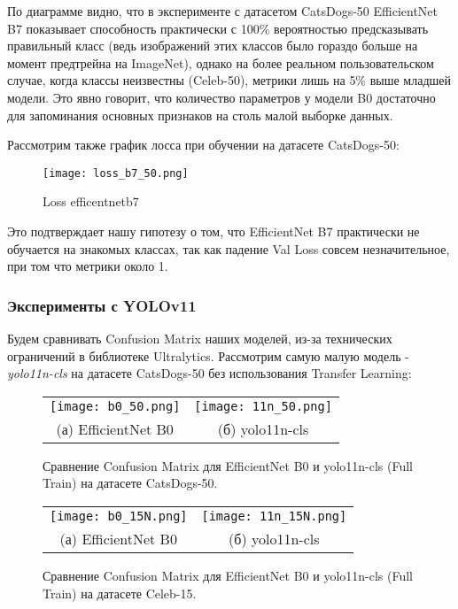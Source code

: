 \documentclass[14pt]{extarticle}
\begin{document}
По диаграмме видно, что в эксперименте с датасетом CatsDogs-50 EfficientNet B7 показывает способность практически с 100\% вероятностью предсказывать правильный класс (ведь изображений этих классов было гораздо больше на момент предтрейна на ImageNet), однако на более реальном пользовательском случае, когда классы неизвестны (Celeb-50), метрики лишь на 5\% выше младшей модели. Это явно говорит, что количество параметров у модели B0 достаточно для запоминания основных признаков на столь малой выборке данных. 

Рассмотрим также график лосса при обучении на датасете CatsDogs-50:
\begin{figure}[H]
    \centering
    \texttt{[image: loss\_b7\_50.png]}
    \caption{Loss efficentnet\textunderscore b7}
    \label{fig:имя_метки}
\end{figure}

Это подтверждает нашу гипотезу о том, что EfficientNet B7 практически не обучается на знакомых классах, так как падение Val Loss совсем незначительное, при том что метрики около 1.
\subsubsection{Эксперименты с YOLOv11}

Будем сравнивать Confusion Matrix наших моделей, из-за технических ограничений в библиотеке Ultralytics. Рассмотрим самую малую модель - \textit{yolo11n-cls} на датасете CatsDogs-50 без использования Transfer Learning:
\begin{figure}[H] 
    \centering 
    \begin{tabular}{cc} 
        \texttt{[image: b0\_50.png]} & 
        \texttt{[image: 11n\_50.png]} \\
        (а)  EfficientNet B0  & 
        (б) yolo11n-cls
    \end{tabular}

    \caption{Сравнение Confusion Matrix для EfficientNet B0 и yolo11n-cls (Full Train) на датасете CatsDogs-50.}
\end{figure}
\begin{figure}[H] 
    \centering 
    \begin{tabular}{cc} 
        \texttt{[image: b0\_15N.png]} & 
        \texttt{[image: 11n\_15N.png]} \\
        (а)  EfficientNet B0  & 
        (б) yolo11n-cls
    \end{tabular}

    \caption{Сравнение Confusion Matrix для EfficientNet B0 и yolo11n-cls (Full Train) на датасете Celeb-15.}
\end{figure}
\end{document}
